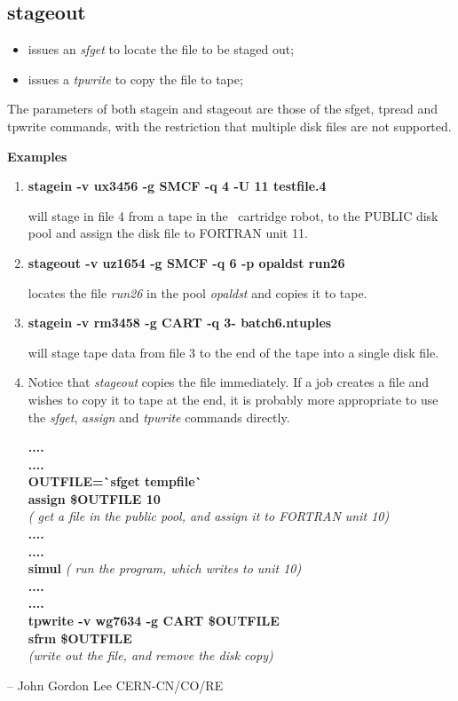  
\subsection{stageout}
\begin{itemize}
\item issues an {\it sfget} to locate the file to be staged out;
\item issues a {\it tpwrite} to copy the file to tape;
\end{itemize}
 
The parameters of both stagein and stageout are those of the
sfget, tpread and tpwrite commands, with the restriction that multiple
disk files are not supported.
 
 
{\bf Examples}
 
\begin{enumerate}
\item {\bf stagein -v ux3456 -g SMCF -q 4 -U 11 testfile.4}
 
will stage in file 4 from a tape in the \CERN\ cartridge robot,
to the PUBLIC disk pool and assign
the disk file to FORTRAN unit 11.
 
\item {\bf stageout -v uz1654 -g SMCF -q 6 -p opaldst run26}
 
locates the file {\it run26} in the pool {\it opaldst} and copies it to tape.
 
\item {\bf stagein -v rm3458 -g CART -q 3- batch6.ntuples}
 
will stage tape data from file 3 to the end of the tape into a single disk file.
 
\item Notice that {\it stageout} copies the file immediately.
If a job creates a file
and wishes to copy it to tape at the end, it is probably more appropriate to use
 the
{\it sfget}, {\it assign} and {\it tpwrite} commands directly.
 
{\bf ....\\
....\\
OUTFILE=\`{}sfget tempfile\`{}\\
assign \$OUTFILE 10}\\
{\it ( get a file in the public pool, and assign it to FORTRAN unit 10)}\\
{\bf ....\\
....\\
simul}  {\it ( run the program, which writes to unit 10)}\\
{\bf ....\\
....\\
tpwrite -v wg7634 -g CART \$OUTFILE\\
sfrm \$OUTFILE}\\
{\it (write out the file, and remove the disk copy)}
 
\end{enumerate}
 
 

 
 
 
--
John Gordon Lee
CERN-CN/CO/RE
